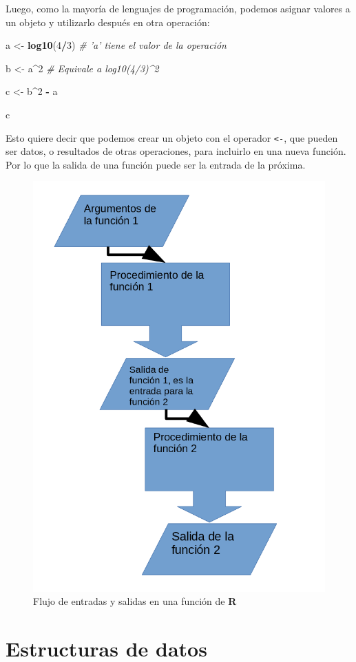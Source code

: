 \documentclass[12pt,letterpaper,]{book}
\newenvironment{Shaded}{\begin{snugshade}}{\end{snugshade}}
\newcommand{\KeywordTok}[1]{\textcolor[rgb]{0.13,0.29,0.53}{\textbf{#1}}}
\newcommand{\DecValTok}[1]{\textcolor[rgb]{0.00,0.00,0.81}{#1}}
\newcommand{\StringTok}[1]{\textcolor[rgb]{0.31,0.60,0.02}{#1}}
\newcommand{\CommentTok}[1]{\textcolor[rgb]{0.56,0.35,0.01}{\textit{#1}}}
\newcommand{\OperatorTok}[1]{\textcolor[rgb]{0.81,0.36,0.00}{\textbf{#1}}}
\newcommand{\NormalTok}[1]{#1}
\begin{document}
Luego, como la mayoría de lenguajes de programación, podemos asignar
valores a un objeto y utilizarlo después en otra operación:

\begin{Shaded}
\begin{Highlighting}[]
\NormalTok{a <-}\StringTok{ }\KeywordTok{log10}\NormalTok{(}\DecValTok{4}\OperatorTok{/}\DecValTok{3}\NormalTok{)  }\CommentTok{# 'a' tiene el valor de la operación}

\NormalTok{b <-}\StringTok{ }\NormalTok{a}\OperatorTok{^}\DecValTok{2} \CommentTok{# Equivale a log10(4/3)^2}

\NormalTok{c <-}\StringTok{ }\NormalTok{b}\OperatorTok{^}\DecValTok{2} \OperatorTok{-}\StringTok{ }\NormalTok{a}

\NormalTok{c}
\end{Highlighting}
\end{Shaded}

Esto quiere decir que podemos crear un objeto con el operador
\texttt{\textless{}-}, que pueden ser datos, o resultados de otras
operaciones, para incluirlo en una nueva función. Por lo que la salida
de una función puede ser la entrada de la próxima.

\begin{figure}[thb!]

{\centering \includegraphics[width=0.4\linewidth]{figuras/RFunctionsFlow} 

}

\caption{Flujo de entradas y salidas en una función de \textbf{R}}\label{fig:RFunctionFlow}
\end{figure}

\section{Estructuras de datos}\label{estructuras-de-datos}
\end{document}
